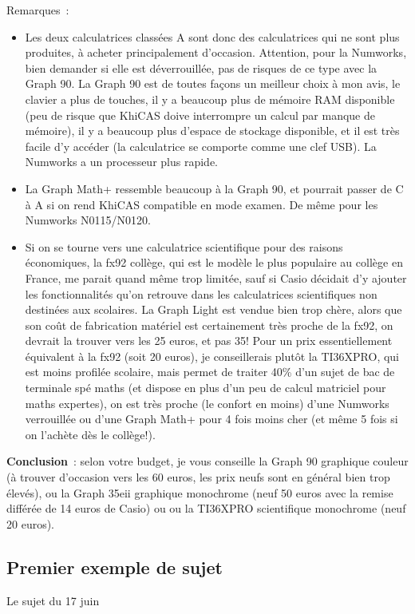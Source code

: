 \documentclass{article}
\begin{document}
\begin{giacjshere}
Remarques~:
\begin{itemize}
\item Les deux calculatrices classées A sont donc des calculatrices qui ne
sont plus produites, à acheter principalement d'occasion. Attention,
pour la Numworks, bien demander si elle est déverrouillée, pas
de risques de ce type avec la Graph 90.
La Graph 90 est de toutes façons un meilleur choix à mon avis, 
le clavier a plus de touches,
il y a beaucoup plus de mémoire RAM disponible (peu de risque
que KhiCAS doive interrompre un calcul par manque de mémoire), il
y a beaucoup plus d'espace de stockage disponible, et il est très facile
d'y accéder (la calculatrice se comporte comme une clef USB).
La Numworks a un processeur plus rapide.
\item La Graph Math+ ressemble beaucoup à la Graph 90, et pourrait passer
de C à A si on rend KhiCAS compatible en mode examen. De même pour les
Numworks N0115/N0120.
\item Si on se tourne vers une calculatrice scientifique 
pour des raisons économiques, la fx92 collège,
qui est le modèle le plus populaire au collège en France, 
me parait quand même trop limitée,
sauf si Casio décidait d'y ajouter les fonctionnalités qu'on retrouve
dans les calculatrices scientifiques non destinées aux scolaires. La Graph
Light est vendue bien trop chère, alors que son coût de fabrication
matériel est certainement très proche de la fx92, on devrait 
la trouver vers les 25 euros, et pas 35! Pour
un prix essentiellement équivalent à la fx92 (soit 20 euros), je conseillerais
plutôt la TI36XPRO, qui est moins profilée scolaire, mais permet
de traiter 40\% d'un sujet de bac de terminale spé maths (et dispose
en plus d'un peu de calcul matriciel pour maths expertes), 
on est très proche (le confort en moins) d'une
Numworks verrouillée ou d'une Graph Math+ pour 4 fois moins cher
(et même 5 fois si on l'achète dès le collège!).
\end{itemize}
{\bf Conclusion}~: selon votre budget, je vous conseille la Graph 90 
graphique couleur (à trouver d'occasion vers les 60 euros, 
les prix neufs sont en général bien trop élevés), 
ou la Graph 35eii graphique monochrome 
(neuf 50 euros avec la remise différée de 14 euros de Casio) ou
ou la TI36XPRO scientifique monochrome (neuf 20 euros).

\subsection{Premier exemple de sujet}
Le sujet du 17 juin


\end{giacjshere}
\end{document}

